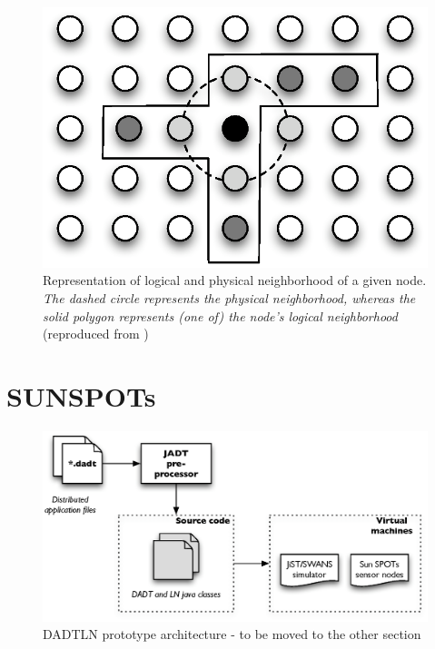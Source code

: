 \begin{figure} 
\centering
\label{Fig:LN_physical_vs_logical}
\includegraphics[scale=0.65]{img/LN_physical_vs_logical.eps} 
\caption[Difference between physical and logical neighborhoods]{Representation 
of logical and physical neighborhood of a given node. \emph{The dashed circle 
represents the physical neighborhood, whereas the solid polygon represents (one 
of) the node's logical neighborhood} (reproduced from
\cite{mottola_LN:2006})}
\end{figure} 

\section {SUNSPOTs}	
 
  
\begin{figure}[ht]
\centering
\label{Fig:DADTLN_architecture}
\includegraphics[scale=0.71]{img/DADTLN_architecture.eps} \caption[DADTLN
prototype architecture - to be renamed]{DADTLN prototype architecture - to
be moved to the other section}
\end{figure} 
